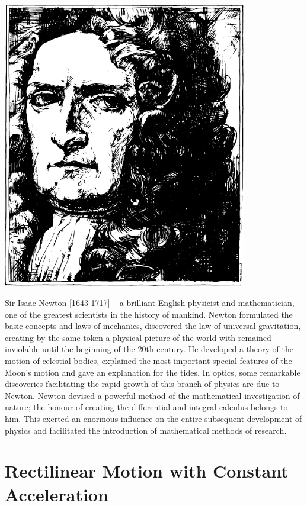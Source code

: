 \begin{center}
\includegraphics[width=0.8\textwidth]{figures/newton.pdf}
\end{center}

{\small \textsf{{Sir Isaac Newton [1643-1717]}} -- \textsf{\footnotesize a brilliant English physicist and
mathematician, one of the greatest scientists in the history of
mankind. Newton formulated the basic concepts and laws of
mechanics, discovered the law of universal gravitation, creating
by the same token a physical picture of the world with remained inviolable until the beginning of the 20th century. He
developed a theory of the motion of celestial bodies, explained
the most important special features of the Moon's motion and
gave an explanation for the tides. In optics, some remarkable
discoveries facilitating the rapid growth of this branch of physics are due to Newton. Newton devised a powerful method of the
mathematical investigation of nature; the honour of creating the
differential and integral calculus belongs to him. This exerted an
enormous influence on the entire subsequent development of
physics and facilitated the introduction of mathematical methods
of research.}}



\section{Rectilinear Motion with Constant Acceleration}

